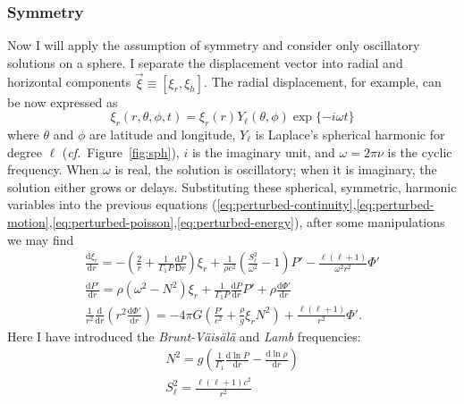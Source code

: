 \subsubsection*{Symmetry}
Now I will apply the assumption of symmetry and consider only oscillatory solutions on a sphere. 
I separate the displacement vector into radial and horizontal components ${\vec\xi\equiv[\xi_r, \xi_h]}$. 
The radial displacement, for example, can be now expressed as 
\begin{equation}
    \xi_r(r, \theta, \phi, t)
    =
    \xi_r(r)
    Y_{\ell}(\theta, \phi)
    \exp \{
        -i\omega t
    \}
\end{equation}
where $\theta$ and $\phi$ are latitude and longitude, $Y_{\ell}$ is Laplace's spherical harmonic for degree $\ell$ (\emph{cf.}~Figure~\ref{fig:sph}), $i$ is the imaginary unit, and ${\omega=2\pi\nu}$ is the cyclic frequency. 
When $\omega$ is real, the solution is oscillatory; when it is imaginary, the solution either grows or delays. 
Substituting these spherical, symmetric, harmonic variables into the previous equations (\ref{eq:perturbed-continuity},\ref{eq:perturbed-motion},\ref{eq:perturbed-poisson},\ref{eq:perturbed-energy}), after some manipulations we may find 
\begin{gather} \label{eq:oscillation1}
    \frac{\text{d}\xi_r}{\text{d}r}
    =
    -\left(
        \frac{2}{r}
        +
        \frac{1}{\Gamma_1 P}
        \frac{\text{d}P}{\text{D}r}
    \right)
    \xi_r
    +
    \frac{1}{\rho c^2}
    \left(
        \frac{S_\ell^2}{\omega^2}
        -
        1
    \right)
    P'
    -
    \frac{\ell(\ell+1)}{\omega^2 r^2}
    \Phi'
    \\
    \frac{\text{d}P'}{\text{d}r}
    =
    \rho \left(
        \omega^2 - N^2
    \right) 
    \xi_r
    +
    \frac{1}{\Gamma_1 P}
    \frac{\text{d}P}{\text{d}r}
    P'
    +
    \rho \frac{\text{d} \Phi'}{\text{d} r}
    \\
    \frac{1}{r^2}
    \frac{\text{d}}{\text{d}r}
    \left(
        r^2
        \frac{\text{d}\Phi'}{\text{d}r}
    \right)
    =
    -4\pi G \left(
        \frac{P'}{c^2}
        +
        \frac{\rho}{g}
        \xi_r
        N^2
    \right)
    +
    \frac{\ell(\ell+1)}{r^2}
    \Phi'. \label{eq:oscillation3}
\end{gather}
Here I have introduced the \emph{Brunt-V\"ais\"al\"a} and \emph{Lamb} frequencies: 
\begin{gather} \label{eq:brunt-vaisala}
    N^2
    =
    g
    \left(
        \frac{1}{\Gamma_1}
        \frac{\text{d} \ln P}{\text{d}r}
        -
        \frac{\text{d} \ln \rho}{\text{d}r}
    \right) 
    \\ \label{eq:lamb}
    S^2_\ell
    =
    \frac{\ell(\ell+1)c^2}{r^2}
\end{gather}
